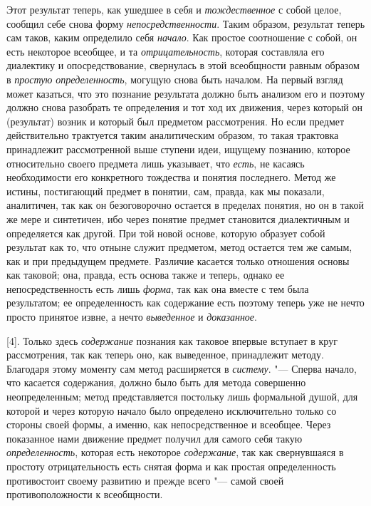 {{Этот результат теперь, как ушедшее в себя и {\em тождественное} с
собой целое, сообщил себе снова форму {\em непосредственности}.
Таким образом, результат теперь сам таков, каким определило
себя {\em начало}. Как
простое соотношение с собой, он есть некоторое всеобщее, и та
{\em отрицательность},
которая составляла его диалектику и опосредствование,
свернулась в этой всеобщности равным образом в
{\em простую определенность},
могущую снова быть началом. На первый взгляд может казаться,
что это познание результата должно быть анализом его и поэтому должно снова
разобрать те определения и тот ход их движения, через который он
(результат) возник и который был предметом рассмотрения. Но если предмет
действительно трактуется таким аналитическим образом, то такая трактовка
принадлежит рассмотренной выше ступени идеи, ищущему познанию, которое
относительно своего предмета лишь указывает, что {\em есть}, не касаясь
необходимости его конкретного тождества и понятия последнего. Метод же
истины, постигающий предмет в понятии, сам, правда, как мы показали,
аналитичен, так как он безоговорочно остается в пределах понятия, но он в
такой же мере и синтетичен, ибо через понятие предмет становится
диалектичным и определяется как другой. При той новой основе, которую
образует собой результат как то, что отныне служит предметом, метод
остается тем же самым, как и при предыдущем предмете. Различие касается
только отношения основы как таковой; она, правда, есть основа также и
теперь, однако ее непосредственность есть лишь {\em форма}, так как она
вместе с тем была результатом; ее определенность как содержание есть
поэтому теперь уже не нечто просто принятое извне, а нечто
{\em выведенное} и {\em доказанное}.

[4]. Только здесь {\em содержание} познания
как таковое впервые вступает в круг рассмотрения, так как теперь оно, как
выведенное, принадлежит методу. Благодаря этому моменту сам метод
расширяется в {\em систему}. "---
Сперва начало, что касается содержания, должно было быть для
метода совершенно неопределенным; метод представляется постольку лишь
формальной душой, для которой и через которую начало было определено
исключительно только со стороны своей формы, а именно, как непосредственное
и всеобщее. Через показанное нами движение предмет получил для самого себя
такую {\em определенность}, которая есть некоторое {\em содержание}, так как
свернувшаяся в простоту отрицательность есть снятая форма и как простая
определенность противостоит своему развитию и прежде всего
"--- самой своей противоположности к всеобщности.

}}
